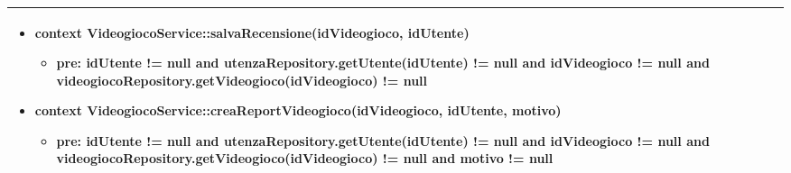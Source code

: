 \begin{tabular}{|| l | p{28em} ||}
\begin{itemize}[leftmargin=*]
		\item \textbf{context} VideogiocoService::salvaRecensione(idVideogioco, idUtente)
		\begin{itemize}
			\item[ ] \textbf{pre:} idUtente != null and utenzaRepository.getUtente(idUtente) != null and idVideogioco != null and videogiocoRepository.getVideogioco(idVideogioco) != null
		\end{itemize}

		\item \textbf{context} VideogiocoService::creaReportVideogioco(idVideogioco, idUtente, motivo)
		\begin{itemize}
			\item[ ] \textbf{pre:} idUtente != null and utenzaRepository.getUtente(idUtente) != null and idVideogioco != null and videogiocoRepository.getVideogioco(idVideogioco) != null and motivo != null
		\end{itemize}
	\end{itemize}\\
	\hline
\end{tabular}

\newpage

